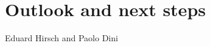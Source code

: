 \chapter{Outlook and next steps}
\label{ch:Outlook}

\vspace{-1cm}
\begin{center}
Eduard Hirsch and Paolo Dini
\end{center}

